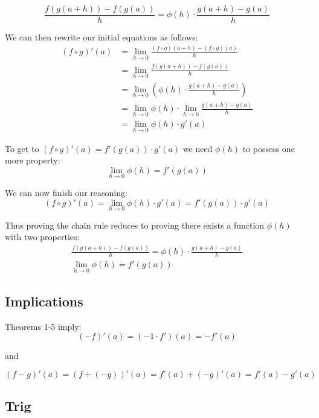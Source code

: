 \[\frac{f(g(a+h))-f(g(a))}{h}=\phi(h)\cdot\frac{g(a+h)-g(a)}{h}\]

We can then rewrite our initial equations as follows:
\begin{align*}
  (f\circ g)'(a)&=\lim_{h\to0}\frac{(f\circ g)(a+h)-(f\circ g)(a)}{h}\\
            &=\lim_{h\to0}\frac{f(g(a+h))-f(g(a))}{h}\\
            &=\lim_{h\to0}\left(\phi(h)\cdot\frac{g(a+h)-g(a)}{h}\right)\\
            &=\lim_{h\to0}\phi(h)\cdot\lim_{h\to0}\frac{g(a+h)-g(a)}{h}\\
            &=\lim_{h\to0}\phi(h)\cdot g'(a)
\end{align*}

To get to $(f\circ g)'(a)=f'(g(a))\cdot g'(a)$ we need $\phi(h)$ to possess one
more property:
\[\lim_{h\to0}\phi(h)=f'(g(a))\]

We can now finish our reasoning:
\[(f\circ g)'(a)=\lim_{h\to0}\phi(h)\cdot g'(a)=f'(g(a))\cdot g'(a)\]

Thus proving the chain rule reduces to proving there exists a
function $\phi(h)$ with two properties:
\setcounter{equation}{0}
\begin{gather}
\frac{f(g(a+h))-f(g(a))}{h}=\phi(h)\cdot\frac{g(a+h)-g(a)}{h}\\
\lim_{h\to0}\phi(h)=f'(g(a))
\end{gather}

\subsection{Implications}
Theorems 1-5 imply:
\[(-f)'(a)=(-1\cdot f')(a)=-f'(a)\]
\begin{center}and\end{center}
\[(f-g)'(a)=(f+(-g))'(a)=f'(a)+(-g)'(a)=f'(a)-g'(a)\]

\subsection{Trig}

